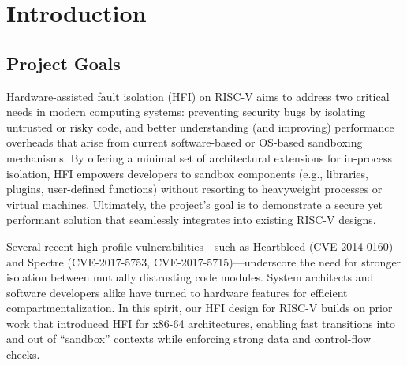 \documentclass[conference,compsoc]{IEEEtran}
\begin{document}




\maketitle

\begin{abstract}
\end{abstract}





%
\IEEEpeerreviewmaketitle



\section{Introduction}

\subsection{Project Goals}
Hardware-assisted fault isolation (HFI) on RISC-V aims to address two critical needs in modern computing systems: preventing security bugs by isolating untrusted or risky code, and better understanding (and improving) performance overheads that arise from current software-based or OS-based sandboxing mechanisms. By offering a minimal set of architectural extensions for in-process isolation, HFI empowers developers to sandbox components (e.g., libraries, plugins, user-defined functions) without resorting to heavyweight processes or virtual machines. Ultimately, the project's goal is to demonstrate a secure yet performant solution that seamlessly integrates into existing RISC-V designs.

Several recent high-profile vulnerabilities—such as Heartbleed (CVE-2014-0160) and Spectre (CVE-2017-5753, CVE-2017-5715)—underscore the need for stronger isolation between mutually distrusting code modules. System architects and software developers alike have turned to hardware features for efficient compartmentalization. In this spirit, our HFI design for RISC-V builds on prior work that introduced HFI for x86-64 architectures, enabling fast transitions into and out of “sandbox” contexts while enforcing strong data and control-flow checks.
\end{document}
